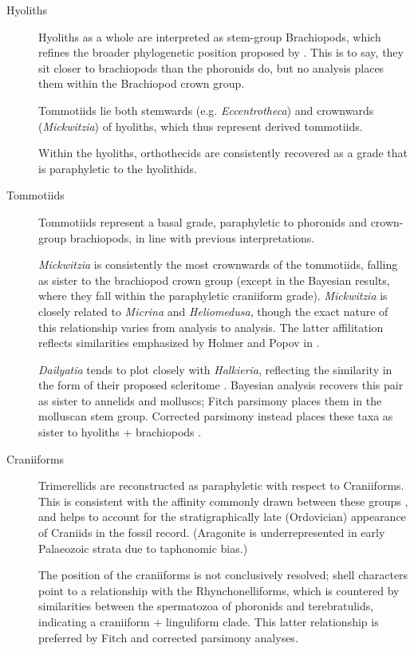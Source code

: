 \documentclass[openany]{book}
\begin{document}
\begin{description}
\item[Hyoliths]
Hyoliths as a whole are interpreted as stem-group Brachiopods, which
refines the broader phylogenetic position proposed by
\citet{Moysiuk2017Hyolithsare}. This is to say, they sit closer to
brachiopods than the phoronids do, but no analysis places them within
the Brachiopod crown group.

Tommotiids lie both stemwards (e.g. \emph{Eccentrotheca}) and crownwards
(\emph{Mickwitzia}) of hyoliths, which thus represent derived
tommotiids.

Within the hyoliths, orthothecids are consistently recovered as a grade
that is paraphyletic to the hyolithids.
\item[Tommotiids]
Tommotiids represent a basal grade, paraphyletic to phoronids and
crown-group brachiopods, in line with previous interpretations.

\emph{Mickwitzia} is consistently the most crownwards of the tommotiids,
falling as sister to the brachiopod crown group (except in the Bayesian
results, where they fall within the paraphyletic craniiform grade).
\emph{Mickwitzia} is closely related to \emph{Micrina} and
\emph{Heliomedusa}, though the exact nature of this relationship varies
from analysis to analysis. The latter affilitation reflects similarities
emphasized by Holmer and Popov in \citet{Williams2007Supplement}.

\emph{Dailyatia} tends to plot closely with \emph{Halkieria}, reflecting
the similarity in the form of their proposed scleritome
\citep{Skovsted2015Theearly}. Bayesian analysis recovers this pair as
sister to annelids and molluscs; Fitch parsimony places them in the
molluscan stem group. Corrected parsimony instead places these taxa as
sister to hyoliths + brachiopods \citep[cf.][]{Zhao2017}.
\item[Craniiforms]
Trimerellids are reconstructed as paraphyletic with respect to
Craniiforms. This is consistent with the affinity commonly drawn between
these groups \citep[e.g.][]{Williams2000LinguliformeaCraniiformea}, and
helps to account for the stratigraphically late (Ordovician) appearance
of Craniids in the fossil record. (Aragonite is underrepresented in
early Palaeozoic strata due to taphonomic bias.)

The position of the craniiforms is not conclusively resolved; shell
characters point to a relationship with the Rhynchonelliforms, which is
countered by similarities between the spermatozoa of phoronids and
terebratulids, indicating a craniiform + linguliform clade. This latter
relationship is preferred by Fitch and corrected parsimony analyses.


\end{description}
\end{document}

